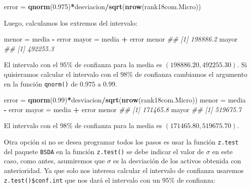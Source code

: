 \documentclass[
]{krantz}
\makeatletter
\newenvironment{Shaded}{\begin{snugshade}}{\end{snugshade}}
\newcommand{\CommentTok}[1]{\textcolor[rgb]{0.37,0.37,0.37}{\textit{#1}}}
\newcommand{\FloatTok}[1]{\textcolor[rgb]{0.06,0.06,0.06}{#1}}
\newcommand{\KeywordTok}[1]{\textcolor[rgb]{0.27,0.27,0.27}{\textbf{#1}}}
\newcommand{\NormalTok}[1]{#1}
\newcommand{\OperatorTok}[1]{\textcolor[rgb]{0.43,0.43,0.43}{\textbf{#1}}}
\newcommand{\StringTok}[1]{\textcolor[rgb]{0.5,0.5,0.5}{#1}}
\newenvironment{kframe}{%
\medskip{}
\setlength{\fboxsep}{.8em}
 \def\at@end@of@kframe{}%
 \ifinner\ifhmode%
  \def\at@end@of@kframe{\end{minipage}}%
  \begin{minipage}{\columnwidth}%
 \fi\fi%
 \def\FrameCommand##1{\hskip\@totalleftmargin \hskip-\fboxsep
 \colorbox{shadecolor}{##1}\hskip-\fboxsep
     \hskip-\linewidth \hskip-\@totalleftmargin \hskip\columnwidth}%
 \MakeFramed {\advance\hsize-\width
   \@totalleftmargin\z@ \linewidth\hsize
   \@setminipage}}%
 {\par\unskip\endMakeFramed%
 \at@end@of@kframe}
\renewenvironment{Shaded}{\begin{kframe}}{\end{kframe}}
\makeatother
\begin{document}
\begin{Shaded}
\begin{Highlighting}[]
\NormalTok{error  =}\StringTok{ }\KeywordTok{qnorm}\NormalTok{(}\FloatTok{0.975}\NormalTok{)}\OperatorTok{*}\NormalTok{desviacion}\OperatorTok{/}\KeywordTok{sqrt}\NormalTok{(}\KeywordTok{nrow}\NormalTok{(rank18com.Micro))}
\end{Highlighting}
\end{Shaded}

Luego, calculamos los extremos del intervalo:

\begin{Shaded}
\begin{Highlighting}[]

\NormalTok{menor =}\StringTok{ }\NormalTok{media }\OperatorTok{-}\StringTok{ }\NormalTok{error}
\NormalTok{mayor =}\StringTok{ }\NormalTok{media }\OperatorTok{+}\StringTok{ }\NormalTok{error}
\NormalTok{menor}
\CommentTok{## [1] 198886.2}
\NormalTok{mayor}
\CommentTok{## [1] 492255.3}
\end{Highlighting}
\end{Shaded}

El intervalo con el \(95\%\) de confianza para la media es \(\left( 198886.20, 492255.30 \right)\). Si quisieramos calcular el intervalo con el \(98\%\) de confianza cambiamos el argumento en la función \texttt{qnorm()} de \(0.975\) a \(0.99\).

\begin{Shaded}
\begin{Highlighting}[]

\NormalTok{error  =}\StringTok{ }\KeywordTok{qnorm}\NormalTok{(}\FloatTok{0.99}\NormalTok{)}\OperatorTok{*}\NormalTok{desviacion}\OperatorTok{/}\KeywordTok{sqrt}\NormalTok{(}\KeywordTok{nrow}\NormalTok{(rank18com.Micro))}
\NormalTok{menor =}\StringTok{ }\NormalTok{media }\OperatorTok{-}\StringTok{ }\NormalTok{error}
\NormalTok{mayor =}\StringTok{ }\NormalTok{media }\OperatorTok{+}\StringTok{ }\NormalTok{error}
\NormalTok{menor}
\CommentTok{## [1] 171465.8}
\NormalTok{mayor}
\CommentTok{## [1] 519675.7}
\end{Highlighting}
\end{Shaded}

El intervalo con el \(98\%\) de confianza para la media es \(\left( 171465.80, 519675.70 \right)\).

Otra opción si no se desea programar todos los pasos es usar la función \texttt{z.test} del paquete \texttt{BSDA} en la función \texttt{z.test()} se debe indicar el valor de \(\sigma\) en este caso, como antes, asumiremos que \(\sigma\) es la desviación de los activos obtenida con anterioridad. Ya que solo nos interesa calcular el intervalo de confianza usaremos \texttt{z.test()\$conf.int} que nos dará el intervalo con un \(95\%\) de confianza:
\end{document}

